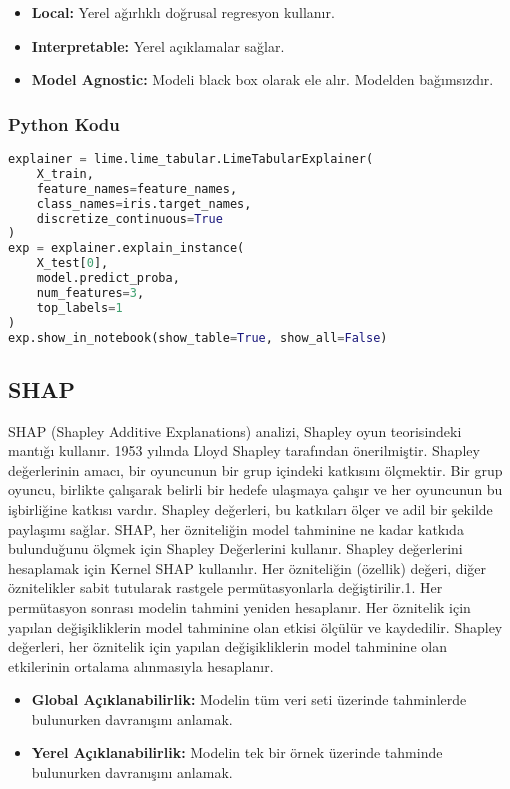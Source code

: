 \begin{itemize}
    \item \textbf{Local:} Yerel ağırlıklı doğrusal regresyon kullanır.
    \item \textbf{Interpretable:} Yerel açıklamalar sağlar.
    \item \textbf{Model Agnostic:} Modeli black box olarak ele alır. Modelden bağımsızdır.
\end{itemize}

\subsubsection{Python Kodu}

\begin{lstlisting}[language=Python]
explainer = lime.lime_tabular.LimeTabularExplainer(
	X_train, 
	feature_names=feature_names, 
	class_names=iris.target_names, 
	discretize_continuous=True
)
exp = explainer.explain_instance(
	X_test[0], 
	model.predict_proba, 
	num_features=3, 
	top_labels=1
)
exp.show_in_notebook(show_table=True, show_all=False)
\end{lstlisting}

\subsection{SHAP}
SHAP (Shapley Additive Explanations) analizi, Shapley oyun teorisindeki mantığı kullanır. 1953 yılında Lloyd Shapley tarafından önerilmiştir. Shapley değerlerinin amacı, bir oyuncunun bir grup içindeki katkısını ölçmektir. Bir grup oyuncu, birlikte çalışarak belirli bir hedefe ulaşmaya çalışır ve her oyuncunun bu işbirliğine katkısı vardır. Shapley değerleri, bu katkıları ölçer ve adil bir şekilde paylaşımı sağlar. SHAP, her özniteliğin model tahminine ne kadar katkıda bulunduğunu ölçmek için Shapley Değerlerini kullanır. Shapley değerlerini hesaplamak için Kernel SHAP kullanılır. Her özniteliğin (özellik) değeri, diğer öznitelikler sabit tutularak rastgele permütasyonlarla değiştirilir.1. Her permütasyon sonrası modelin tahmini yeniden hesaplanır. Her öznitelik için yapılan değişikliklerin model tahminine olan etkisi ölçülür ve kaydedilir. Shapley değerleri, her öznitelik için yapılan değişikliklerin model tahminine olan etkilerinin ortalama alınmasıyla hesaplanır.

\begin{itemize}
    \item \textbf{Global Açıklanabilirlik:} Modelin tüm veri seti üzerinde tahminlerde bulunurken davranışını anlamak.
    \item \textbf{Yerel Açıklanabilirlik:} Modelin tek bir örnek üzerinde tahminde bulunurken davranışını anlamak.
\end{itemize}

